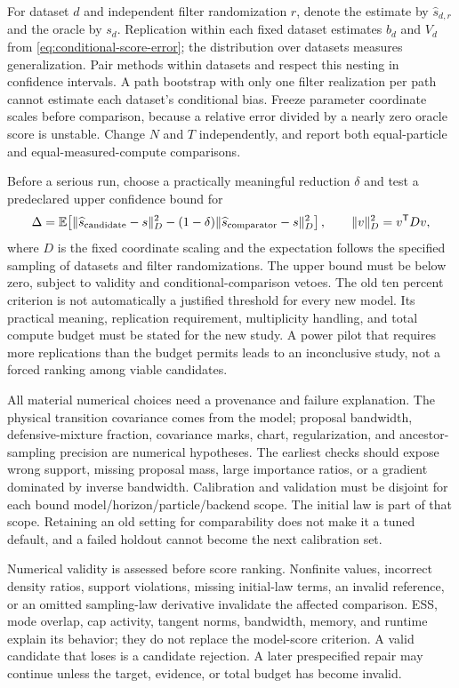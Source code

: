 \documentclass[11pt]{article}
\begin{document}
For dataset $d$ and independent filter randomization $r$, denote the estimate
by $\widehat s_{d,r}$ and the oracle by $s_d$. Replication within each fixed
dataset estimates $b_d$ and $V_d$ from
\eqref{eq:conditional-score-error}; the distribution over datasets measures
generalization. Pair methods within datasets and respect this nesting in
confidence intervals. A path bootstrap with only one filter realization per
path cannot estimate each dataset's conditional bias. Freeze parameter
coordinate scales before comparison, because a relative error divided by a
nearly zero oracle score is unstable. Change $N$ and $T$ independently, and
report both equal-particle and equal-measured-compute comparisons.

Before a serious run, choose a practically meaningful reduction $\delta$ and
test a predeclared upper confidence bound for
\begin{equation}
 \Delta=\mathbb E\!\left[
    \|\widehat s_{\rm candidate}-s\|_D^2
    -(1-\delta)\|\widehat s_{\rm comparator}-s\|_D^2\right],
 \qquad \|v\|_D^2=v^\mathsf T Dv,
 \label{eq:next-study-criterion}
\end{equation}
where $D$ is the fixed coordinate scaling and the expectation follows the
specified sampling of datasets and filter randomizations. The upper bound must be below
zero, subject to validity and conditional-comparison vetoes. The old ten
percent criterion is not automatically a justified threshold for every new
model. Its practical meaning, replication requirement, multiplicity handling,
and total compute budget must be stated for the new study. A power pilot that
requires more replications than the budget permits leads to an inconclusive
study, not a forced ranking among viable candidates.

All material numerical choices need a provenance and failure explanation.
The physical transition covariance comes from the model; proposal bandwidth,
defensive-mixture fraction, covariance marks, chart, regularization, and
ancestor-sampling precision are numerical hypotheses. The earliest checks
should expose wrong support, missing proposal mass, large importance ratios,
or a gradient dominated by inverse bandwidth. Calibration and validation
must be disjoint for each bound model/horizon/particle/backend scope. The
initial law is part of that scope. Retaining an old setting for comparability
does not make it a tuned default, and a failed holdout cannot become the next
calibration set.

Numerical validity is assessed before score ranking. Nonfinite values,
incorrect density ratios, support violations, missing initial-law terms,
an invalid reference, or an omitted sampling-law derivative invalidate the
affected comparison. ESS, mode overlap, cap activity, tangent norms, bandwidth,
memory, and runtime explain its behavior; they do not replace the model-score
criterion. A valid candidate that loses is a candidate rejection. A later
prespecified repair may continue unless the target, evidence, or total budget
has become invalid.
\end{document}
